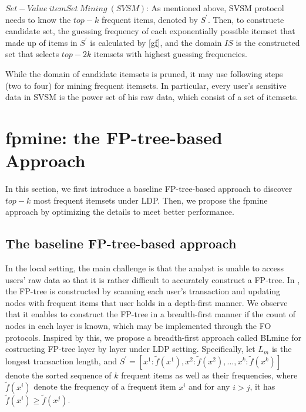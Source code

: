 \documentclass[conference]{IEEEtran}
\begin{document}
$Set-Value\ itemSet\ Mining\ (SVSM)$: As mentioned above, SVSM protocol needs to know the $top-k$ frequent items, denoted by $S^{\prime}$. Then, to constructe candidate set, the guessing frequency of each  exponentially possible itemset that made up of items in $S^{\prime}$ is calculated by \eqref{gf}, and the domain $IS$ is the constructed set that selects $top-2k$ itemsets with highest guessing frequencies.

While the domain of candidate itemsets is pruned, it may use following steps (two to four) for mining frequent itemsets. In particular, every user's sensitive data in SVSM is the power set of his raw data, which  consist of a set of itemsets.

\section{fpmine: the FP-tree-based Approach}
In this section, we first introduce a baseline FP-tree-based approach to discover $top-k$ most frequent itemsets under LDP. Then, we propose the fpmine approach by optimizing the details to meet better performance.

\subsection{The baseline FP-tree-based approach}
In the local setting, the main challenge is that the analyst is unable to access users' raw data so that it is rather difficult to accurately construct a FP-tree. In \cite{fp}, the FP-tree is constructed by scanning each user's transaction and updating nodes with frequent items that user holds in a depth-first manner. We observe that it enables to construct the FP-tree in a breadth-first manner if the count of nodes in each layer is known, which may be implemented through the FO protocols. Inspired by this, we propose a breadth-first approach {\color{red}called BLmine} for costructing FP-tree layer by layer under LDP setting. Specifically, 
let $L_m$ is the longest transaction length, and $S^{\prime} = \left [ x^1 : \tilde{f}(x^1),  x^2 : \tilde{f}(x^2),...,x^k : \tilde{f}(x^k) \right ]$ denote the sorted sequence of $k$ frequent items as well as their frequencies, where $\tilde{f}(x^i)$ denote the frequency of a frequent item $x^i$ and for any $i>j$, it has $\tilde{f}(x^i) \geq \tilde{f}(x^j)$. 
\end{document}
